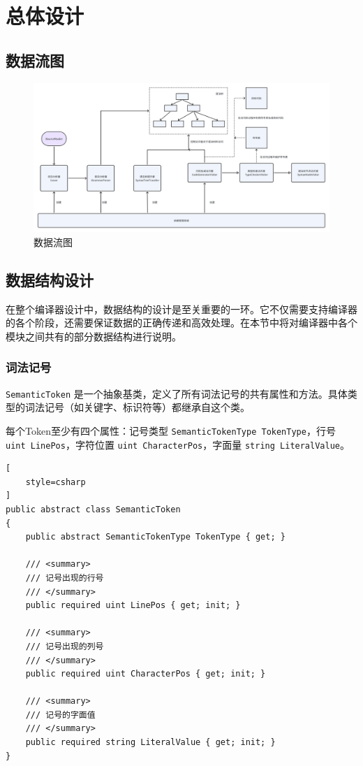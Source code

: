 \documentclass[../main.tex]{subfiles}
\begin{document}
\section{总体设计}


\subsection{数据流图}

\begin{figure}[h]
    \centering
    \includegraphics[width=0.9\linewidth]{assets/数据流图.png}
    \caption{数据流图}
    \label{fig:data_flow_diagram}
\end{figure}

\subsection{数据结构设计}

在整个编译器设计中，数据结构的设计是至关重要的一环。它不仅需要支持编译器的各个阶段，还需要保证数据的正确传递和高效处理。在本节中将对编译器中各个模块之间共有的部分数据结构进行说明。

\subsubsection{词法记号}

\texttt{SemanticToken} 是一个抽象基类，定义了所有词法记号的共有属性和方法。具体类型的词法记号（如关键字、标识符等）都继承自这个类。

每个Token至少有四个属性：记号类型 \texttt{SemanticTokenType TokenType}，行号 \texttt{uint LinePos}，字符位置 \texttt{uint CharacterPos}，字面量 \texttt{string LiteralValue}。

\begin{lstlisting}[
    style=csharp
]
public abstract class SemanticToken
{
    public abstract SemanticTokenType TokenType { get; }
    
    /// <summary>
    /// 记号出现的行号
    /// </summary>
    public required uint LinePos { get; init; }
    
    /// <summary>
    /// 记号出现的列号
    /// </summary>
    public required uint CharacterPos { get; init; }
    
    /// <summary>
    /// 记号的字面值
    /// </summary>
    public required string LiteralValue { get; init; }
}
\end{lstlisting}
\end{document}
